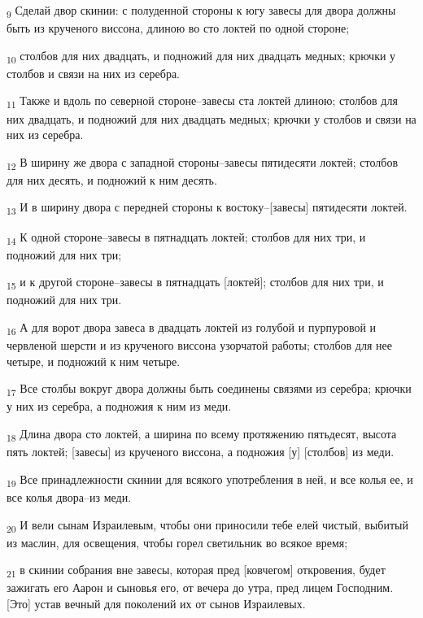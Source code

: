\begin{tcolorbox}
\textsubscript{9} Сделай двор скинии: с полуденной стороны к югу завесы для двора должны быть из крученого виссона, длиною во сто локтей по одной стороне;
\end{tcolorbox}
\begin{tcolorbox}
\textsubscript{10} столбов для них двадцать, и подножий для них двадцать медных; крючки у столбов и связи на них из серебра.
\end{tcolorbox}
\begin{tcolorbox}
\textsubscript{11} Также и вдоль по северной стороне--завесы ста локтей длиною; столбов для них двадцать, и подножий для них двадцать медных; крючки у столбов и связи на них из серебра.
\end{tcolorbox}
\begin{tcolorbox}
\textsubscript{12} В ширину же двора с западной стороны--завесы пятидесяти локтей; столбов для них десять, и подножий к ним десять.
\end{tcolorbox}
\begin{tcolorbox}
\textsubscript{13} И в ширину двора с передней стороны к востоку--[завесы] пятидесяти локтей.
\end{tcolorbox}
\begin{tcolorbox}
\textsubscript{14} К одной стороне--завесы в пятнадцать локтей; столбов для них три, и подножий для них три;
\end{tcolorbox}
\begin{tcolorbox}
\textsubscript{15} и к другой стороне--завесы в пятнадцать [локтей]; столбов для них три, и подножий для них три.
\end{tcolorbox}
\begin{tcolorbox}
\textsubscript{16} А для ворот двора завеса в двадцать локтей из голубой и пурпуровой и червленой шерсти и из крученого виссона узорчатой работы; столбов для нее четыре, и подножий к ним четыре.
\end{tcolorbox}
\begin{tcolorbox}
\textsubscript{17} Все столбы вокруг двора должны быть соединены связями из серебра; крючки у них из серебра, а подножия к ним из меди.
\end{tcolorbox}
\begin{tcolorbox}
\textsubscript{18} Длина двора сто локтей, а ширина по всему протяжению пятьдесят, высота пять локтей; [завесы] из крученого виссона, а подножия [у] [столбов] из меди.
\end{tcolorbox}
\begin{tcolorbox}
\textsubscript{19} Все принадлежности скинии для всякого употребления в ней, и все колья ее, и все колья двора--из меди.
\end{tcolorbox}
\begin{tcolorbox}
\textsubscript{20} И вели сынам Израилевым, чтобы они приносили тебе елей чистый, выбитый из маслин, для освещения, чтобы горел светильник во всякое время;
\end{tcolorbox}
\begin{tcolorbox}
\textsubscript{21} в скинии собрания вне завесы, которая пред [ковчегом] откровения, будет зажигать его Аарон и сыновья его, от вечера до утра, пред лицем Господним. [Это] устав вечный для поколений их от сынов Израилевых.
\end{tcolorbox}
